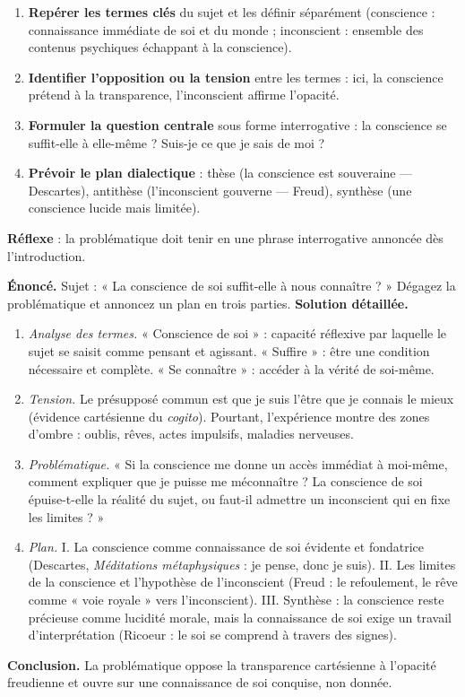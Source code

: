 \documentclass[11pt]{article}
\newcommand{\cle}[1]{{\popxbold\color{popdark}#1}}
\begin{document}
\begin{methode}
\begin{enumerate}
\item \textbf{Repérer les termes clés} du sujet et les définir séparément (\cle{conscience} : connaissance immédiate de soi et du monde ; \cle{inconscient} : ensemble des contenus psychiques échappant à la conscience).
\item \textbf{Identifier l'opposition ou la tension} entre les termes : ici, la conscience prétend à la \cle{transparence}, l'inconscient affirme l'\cle{opacité}.
\item \textbf{Formuler la question centrale} sous forme interrogative : la conscience se suffit-elle à elle-même ? Suis-je ce que je sais de moi ?
\item \textbf{Prévoir le plan dialectique} : thèse (la conscience est souveraine — Descartes), antithèse (l'inconscient gouverne — Freud), synthèse (une conscience lucide mais limitée).
\end{enumerate}
\textbf{Réflexe} : la problématique doit tenir en une phrase interrogative annoncée dès l'introduction.
\end{methode}

\begin{exoresolu}
\textbf{Énoncé.} Sujet : « La conscience de soi suffit-elle à nous connaître ? » Dégagez la problématique et annoncez un plan en trois parties.
\tcblower
\textbf{Solution détaillée.}
\begin{enumerate}
\item \emph{Analyse des termes.} « Conscience de soi » : capacité réflexive par laquelle le sujet se saisit comme pensant et agissant. « Suffire » : être une condition nécessaire et complète. « Se connaître » : accéder à la vérité de soi-même.
\item \emph{Tension.} Le présupposé commun est que je suis l'être que je connais le mieux (évidence cartésienne du \emph{cogito}). Pourtant, l'expérience montre des zones d'ombre : oublis, rêves, actes impulsifs, maladies nerveuses.
\item \emph{Problématique.} « Si la conscience me donne un accès immédiat à moi-même, comment expliquer que je puisse me méconnaître ? La conscience de soi épuise-t-elle la réalité du sujet, ou faut-il admettre un inconscient qui en fixe les limites ? »
\item \emph{Plan.} I. La conscience comme connaissance de soi évidente et fondatrice (Descartes, \emph{Méditations métaphysiques} : je pense, donc je suis). II. Les limites de la conscience et l'hypothèse de l'inconscient (Freud : le refoulement, le rêve comme « voie royale » vers l'inconscient). III. Synthèse : la conscience reste précieuse comme lucidité morale, mais la connaissance de soi exige un travail d'interprétation (Ricoeur : le soi se comprend à travers des signes).
\end{enumerate}
\textbf{Conclusion.} La problématique oppose la transparence cartésienne à l'opacité freudienne et ouvre sur une connaissance de soi conquise, non donnée.
\end{exoresolu}
\end{document}
